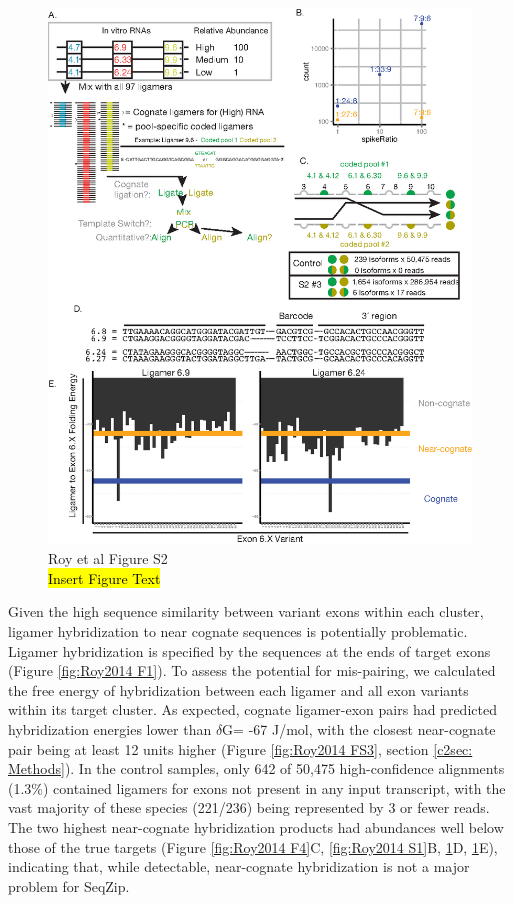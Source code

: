 {		\begin{figure}[htbp] %
			\centering 
			\includegraphics{Figures/SeqZipPaper/Roy2014FigS2.eps}
			\caption[Roy et al Supplemental Figure 2]
			{
				Roy et al Figure S2\\
				\hl{Insert Figure Text}
				}
			\label{fig:Roy2014 S2}
			\end{figure}

		Given the high sequence similarity between variant exons within each cluster, ligamer hybridization to near cognate sequences is potentially problematic. Ligamer hybridization is specified by the sequences at the ends of target exons (Figure \ref{fig:Roy2014 F1}). To assess the potential for mis-pairing, we calculated the free energy of hybridization \citep{Reuter2010} between each ligamer and all exon variants within its target cluster. As expected, cognate ligamer-exon pairs had predicted hybridization energies lower than $\delta$G\degree = -67 J/mol, with the closest near-cognate pair being at least 12 units higher (Figure \ref{fig:Roy2014 FS3}, section \ref{c2sec: Methods}). In the control samples, only 642 of 50,475 high-confidence alignments (1.3\%) contained ligamers for exons not present in any input transcript, with the vast majority of these species (221/236) being represented by 3 or fewer reads.  The two highest near-cognate hybridization products had abundances well below those of the true targets (Figure \ref{fig:Roy2014 F4}C, \ref{fig:Roy2014 S1}B, \ref{fig:Roy2014 S2}D, \ref{fig:Roy2014 S2}E), indicating that, while detectable, near-cognate hybridization is not a major problem for SeqZip.

}
